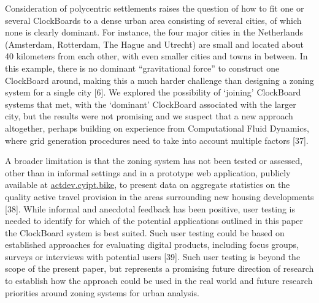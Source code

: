 \documentclass{josis}
\begin{document}
Consideration of polycentric settlements raises the question of how to fit one or several ClockBoards to a dense urban area consisting of several cities, of which none is clearly dominant.
For instance, the four major cities in the Netherlands (Amsterdam, Rotterdam, The Hague and Utrecht) are small and located about 40 kilometers from each other, with even smaller cities and towns in between.
In this example, there is no dominant ``gravitational force'' to construct one ClockBoard around, making this a much harder challenge than designing a zoning system for a single city {[}6{]}.
We explored the possibility of `joining' ClockBoard systems that met, with the `dominant' ClockBoard associated with the larger city, but the results were not promising and we suspect that a new approach altogether, perhaps building on experience from Computational Fluid Dynamics, where grid generation procedures need to take into account multiple factors {[}37{]}.

A broader limitation is that the zoning system has not been tested or assessed, other than in informal settings and in a prototype web application, publicly available at \href{https://actdev.cyipt.bike/ebbsfleet/accessibility,buildings/\#11.69/51.4359/0.3065}{actdev.cyipt.bike}, to present data on aggregate statistics on the quality active travel provision in the areas surrounding new housing developments {[}38{]}.
While informal and anecdotal feedback has been positive, user testing is needed to identify for which of the potential applications outlined in this paper the ClockBoard system is best suited.
Such user testing could be based on established approaches for evaluating digital products, including focus groups, surveys or interviews with potential users {[}39{]}.
Such user testing is beyond the scope of the present paper, but represents a promising future direction of research to establish how the approach could be used in the real world and future research priorities around zoning systems for urban analysis.
\end{document}
